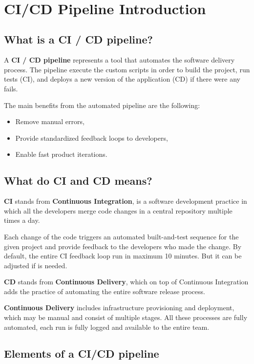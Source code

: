 \documentclass[12pt,a4paper,twoside]{article}
\begin{document}
~\newpage


\section{CI/CD Pipeline Introduction}


\subsection{What is a CI / CD pipeline?}


A \textbf{CI / CD pipeline} represents a tool that automates the software delivery process. The pipeline execute the custom scripts in order to build the project, run tests (CI), and deploys a new version of the application (CD) if there were any fails.

The main benefits from the automated pipeline are the following:


\begin{itemize}
	\item Remove manual errors,
	\item Provide standardized feedback loops to developers,
	\item Enable fast product iterations.
\end{itemize}


\subsection{What do CI and CD means?}


\textbf{CI} stands from \textbf{Continuous Integration}, is a software development practice in which all the developers merge code changes in a central repository multiple times a day.

Each change of the code triggers an automated built-and-test sequence for the given project and provide feedback to the developers who made the change. By default, the entire CI feedback loop run in maximum 10 minutes. But it can be adjusted if is needed.


\textbf{CD} stands from \textbf{Continuous Delivery}, which on top of Continuous Integration adds the practice of automating the entire software release process.

\textbf{Continuous Delivery} includes infrastructure provisioning and deployment, which may be manual and consist of multiple stages. All these processes are fully automated, each run is fully logged and available to the entire team.


\subsection{Elements of a CI/CD pipeline}
\end{document}
